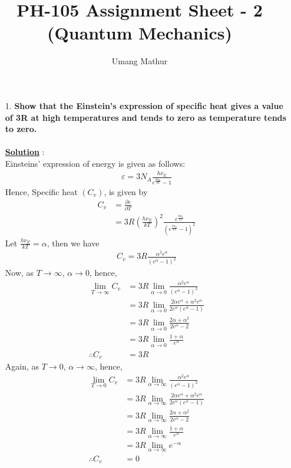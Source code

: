 \documentclass[10pt, a4paper]{article}
\begin{document}
	\title{PH-105 Assignment Sheet - 2 (Quantum Mechanics)}
	\date{}
	\author{Umang Mathur}
	\maketitle
	\begin{enumerate}
		\item[1.] {\bf Show that the Einstein's expression of specific heat gives a value of 3R at high temperatures and tends to zero as temperature tends to zero.}\\\\
		{\underline {\bf Solution}} :\\
		
		Einsteins' expression of energy is given as follows: 
		\begin{align*}
			\varepsilon = 3N_{A} \frac{h\nu_{E}}{e^{\frac{h\nu_{E}}{kT}}-1}
		\end{align*}
		Hence, Specific heat $(C_{v})$, is given by
		\begin{align*}
				C_{v} &= \frac{\partial \varepsilon}{\partial T}\\
				&= 3R (\frac{h\nu_{E}}{kT})^{2} \frac{e^{\frac{h\nu_{E}}{kT}}}{(e^{\frac{h\nu_{E}}{kT}}-1)^{2}}
		\end{align*}
		Let $\frac{h\nu_{E}}{kT} = \alpha$, then we have
		\begin{align*}
			C_{v} = 3R \frac{\alpha^{2} e^{\alpha}}{(e^{\alpha}-1)^{2}}
		\end{align*}
		Now, as $T \to \infty$, $\alpha \to 0$, hence,
		\begin{align*}
			\lim_{T \to \infty}C_{v} &= 3R \lim_{\alpha \to 0}\frac{\alpha^{2} e^{\alpha}}{(e^{\alpha}-1)^{2}}\\
			&= 3R \lim_{\alpha \to 0} \frac{2\alpha e^{\alpha} + \alpha^{2}e^{\alpha}}{2e^{\alpha}(e^{\alpha}-1)}\\
			&= 3R \lim_{\alpha \to 0} \frac{2\alpha + \alpha^{2}}{2e^{\alpha}-2}\\
			&= 3R \lim_{\alpha \to 0} \frac{1+\alpha}{e^{\alpha}}\\
			\therefore C_{v} &= 3R
		\end{align*}
		Again, as $T \to 0$, $\alpha \to \infty$, hence,
		\begin{align*}
			\lim_{T \to 0}C_{v} &= 3R \lim_{\alpha \to \infty}\frac{\alpha^{2} e^{\alpha}}{(e^{\alpha}-1)^{2}}\\
			&= 3R \lim_{\alpha \to \infty} \frac{2\alpha e^{\alpha} + \alpha^{2}e^{\alpha}}{2e^{\alpha}(e^{\alpha}-1)}\\
			&= 3R \lim_{\alpha \to \infty} \frac{2\alpha + \alpha^{2}}{2e^{\alpha}-2}\\
			&= 3R \lim_{\alpha \to \infty} \frac{1+\alpha}{e^{\alpha}}\\
			&= 3R \lim_{\alpha \to \infty} e^{-\alpha}\\
			\therefore C_{v} &= 0
		\end{align*}
	\end{enumerate}
\end{document}
